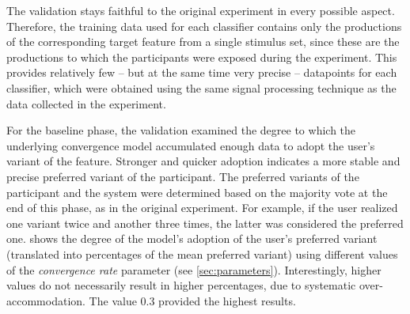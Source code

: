 The validation stays faithful to the original experiment in every possible aspect.
Therefore, the training data used for each classifier contains only the productions of the corresponding target feature from a single stimulus set, since these are the productions to which the participants were exposed during the experiment.
This provides relatively few -- but at the same time very precise -- datapoints for each classifier,
which were obtained using the same signal processing technique as the data collected in the experiment.

For the baseline phase, the validation examined the degree to which the underlying convergence model accumulated enough data to adopt the user's variant of the feature.
Stronger and quicker adoption indicates a more stable and precise preferred variant of the participant.
The preferred variants of the participant and the system were determined based on the majority vote at the end of this phase, as in the original experiment.
For example, if the user realized one variant twice and another three times, the latter was considered the preferred one.
 shows the degree of the model's adoption of the user's preferred variant (translated into percentages of the mean preferred variant) using different values of the \emph{convergence rate} parameter (see \cref{sec:parameters}).
Interestingly, higher values do not necessarily result in higher percentages, due to systematic over-accommodation.
The value 0.3 provided the highest results.%
%
